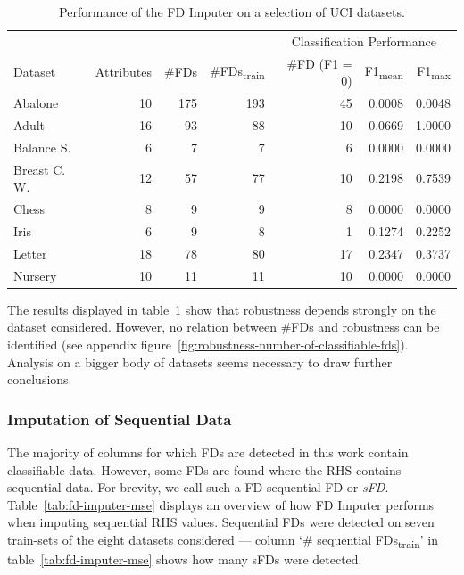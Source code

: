 \begin{table}[ht]
    \centering
    \begin{tabular}{lrrrrrr}
        \toprule
        \toprule
        & & & & \multicolumn{3}{c}{Classification Performance} \\
        \cmidrule(lr{.25em}){5-7}
        Dataset & Attributes & \#FDs & \#FDs\textsubscript{train} & \#FD (F1 = 0) & F1\textsubscript{mean} & F1\textsubscript{max} \\
        \midrule
        Abalone & 10 & 175 & 193 & 45 & 0.0008 & 0.0048 \\
        Adult & 16 & 93 & 88 & 10 & 0.0669 & 1.0000 \\
        Balance S. & 6 & 7 & 7 & 6 & 0.0000 & 0.0000 \\
        Breast C. W. & 12 & 57 & 77 & 10 & 0.2198 & 0.7539 \\
        Chess & 8 & 9 & 9 & 8 & 0.0000 & 0.0000 \\
        Iris & 6 & 9 & 8 & 1 & 0.1274 & 0.2252 \\
        Letter & 18 & 78 & 80 & 17 & 0.2347 & 0.3737 \\
        Nursery & 10 & 11 & 11 & 10 & 0.0000 & 0.0000  \\
        \bottomrule
        \bottomrule
    \end{tabular}
    \caption{Performance of the FD Imputer on a selection of UCI datasets.}\label{tab:fd-imputer-performance}
\end{table}

The results displayed in table~\ref{tab:fd-imputer-performance} show that robustness depends strongly on the dataset considered.
However, no relation between \#FDs and robustness can be identified (see appendix figure~\ref{fig:robustness-number-of-classifiable-fds}).
Analysis on a bigger body of datasets seems necessary to draw further conclusions.

\subsubsection{Imputation of Sequential Data}
The majority of columns for which FDs are detected in this work contain classifiable data.
However, some FDs are found where the RHS contains sequential data.
For brevity, we call such a FD sequential FD or \emph{sFD}.
Table~\ref{tab:fd-imputer-mse} displays an overview of how FD Imputer performs when imputing sequential RHS values.
Sequential FDs were detected on seven train-sets of the eight datasets considered --- column `\# sequential FDs\textsubscript{train}' in table~\ref{tab:fd-imputer-mse} shows how many sFDs were detected.

